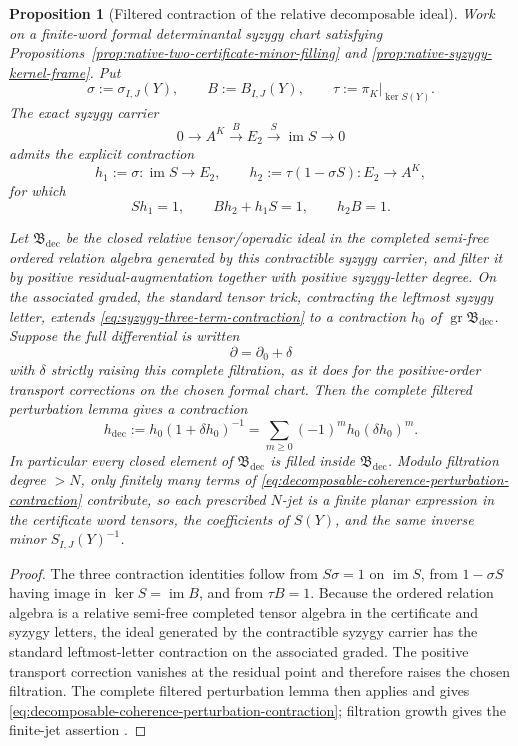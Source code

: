 \documentclass[11pt]{article}
\newtheorem{proposition}[theorem]{Proposition}
\theoremstyle{definition}
\begin{document}
\begin{proposition}[Filtered contraction of the relative decomposable ideal]\label{prop:decomposable-native-coherence-contraction}
Work on a finite-word formal determinantal syzygy chart satisfying
Propositions~\ref{prop:native-two-certificate-minor-filling} and
\ref{prop:native-syzygy-kernel-frame}.  Put
\[
 \sigma:=\sigma_{I,J}(Y),\qquad
 B:=B_{I,J}(Y),\qquad
 \tau:=\pi_K|_{\ker S(Y)}.
\]
The exact syzygy carrier
\[
 0\longrightarrow A^K\xrightarrow{B}E_2\xrightarrow{S}\operatorname{im}S\longrightarrow0
\]
admits the explicit contraction
\begin{equation}\label{eq:syzygy-three-term-contraction}
 h_1:=\sigma:\operatorname{im}S\to E_2,
 \qquad
 h_2:=\tau(1-\sigma S):E_2\to A^K,
\end{equation}
for which
\[
 Sh_1=1,\qquad Bh_2+h_1S=1,\qquad h_2B=1.
\]

Let $\mathfrak B_{\mathrm{dec}}$ be the closed relative tensor/operadic ideal in
the completed semi-free ordered relation algebra generated by this contractible
syzygy carrier, and filter it by positive residual-augmentation together with
positive syzygy-letter degree.  On the associated graded, the standard tensor
trick, contracting the leftmost syzygy letter, extends
\eqref{eq:syzygy-three-term-contraction} to a contraction $h_0$ of
$\operatorname{gr}\mathfrak B_{\mathrm{dec}}$.  Suppose the full differential is
written
\[
 \partial=\partial_0+\delta
\]
with $\delta$ strictly raising this complete filtration, as it does for the
positive-order transport corrections on the chosen formal chart.  Then the
complete filtered perturbation lemma gives a contraction
\begin{equation}\label{eq:decomposable-coherence-perturbation-contraction}
 \boxed{
 h_{\mathrm{dec}}
 :=h_0(1+\delta h_0)^{-1}
 =\sum_{m\ge0}(-1)^m h_0(\delta h_0)^m .}
\end{equation}
In particular every closed element of $\mathfrak B_{\mathrm{dec}}$ is filled
inside $\mathfrak B_{\mathrm{dec}}$.  Modulo filtration degree $>N$, only
finitely many terms of \eqref{eq:decomposable-coherence-perturbation-contraction}
contribute, so each prescribed $N$-jet is a finite planar expression in the
certificate word tensors, the coefficients of $S(Y)$, and the same inverse
minor $S_{I,J}(Y)^{-1}$.
\end{proposition}

\begin{proof}
The three contraction identities follow from $S\sigma=1$ on
$\operatorname{im}S$, from $1-\sigma S$ having image in
$\ker S=\operatorname{im}B$, and from $\tau B=1$.  Because the ordered relation
algebra is a relative semi-free completed tensor algebra in the certificate and
syzygy letters, the ideal generated by the contractible syzygy carrier has the
standard leftmost-letter contraction on the associated graded.  The positive
transport correction vanishes at the residual point and therefore raises the
chosen filtration.  The complete filtered perturbation lemma then applies and
gives \eqref{eq:decomposable-coherence-perturbation-contraction}; filtration
growth gives the finite-jet assertion \cite{ManettiPerturbation,VokrinekHPT}.
\end{proof}
\end{document}
